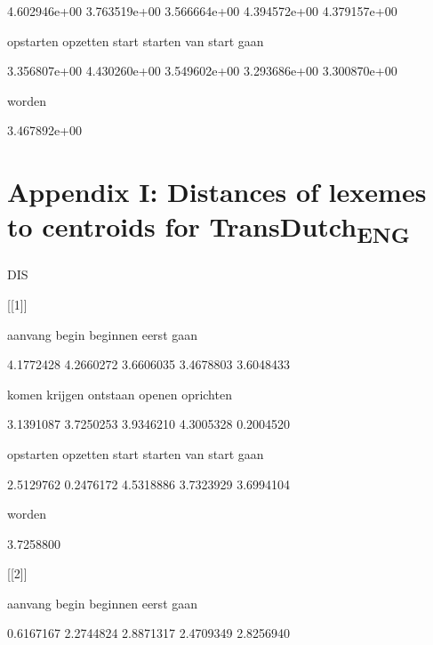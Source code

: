   4.602946e+00   3.763519e+00   3.566664e+00   4.394572e+00   4.379157e+00 



     opstarten       opzetten          start        starten van start gaan 



  3.356807e+00   4.430260e+00   3.549602e+00   3.293686e+00   3.300870e+00 



        worden 



  3.467892e+00 


\section{Appendix I: Distances of lexemes to centroids for TransDutch\textsubscript{ENG}}

DIS



[[1]]



       aanvang          begin       beginnen          eerst           gaan 



     4.1772428      4.2660272      3.6606035      3.4678803      3.6048433 



         komen        krijgen       ontstaan         openen      oprichten 



     3.1391087      3.7250253      3.9346210      4.3005328      0.2004520 



     opstarten       opzetten          start        starten van start gaan 



     2.5129762      0.2476172      4.5318886      3.7323929      3.6994104 



        worden 



     3.7258800 



[[2]]



       aanvang          begin       beginnen          eerst           gaan 



     0.6167167      2.2744824      2.8871317      2.4709349      2.8256940 



